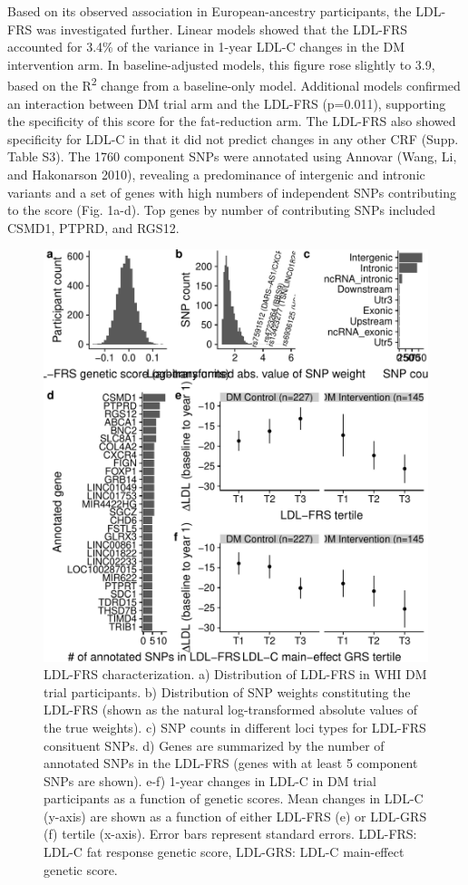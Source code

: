\documentclass[]{article}
\begin{document}
Based on its observed association in European-ancestry participants, the
LDL-FRS was investigated further. Linear models showed that the LDL-FRS
accounted for 3.4\% of the variance in 1-year LDL-C changes in the DM
intervention arm. In baseline-adjusted models, this figure rose slightly
to 3.9, based on the R\textsuperscript{2} change from a baseline-only
model. Additional models confirmed an interaction between DM trial arm
and the LDL-FRS (p=0.011), supporting the specificity of this score for
the fat-reduction arm. The LDL-FRS also showed specificity for LDL-C in
that it did not predict changes in any other CRF (Supp. Table S3). The
1760 component SNPs were annotated using Annovar (Wang, Li, and
Hakonarson 2010), revealing a predominance of intergenic and intronic
variants and a set of genes with high numbers of independent SNPs
contributing to the score (Fig. 1a-d). Top genes by number of
contributing SNPs included CSMD1, PTPRD, and RGS12.

\begin{figure}
\centering
\includegraphics{figures/ldl-score-characterization-1.pdf}
\caption{LDL-FRS characterization. a) Distribution of LDL-FRS in WHI DM
trial participants. b) Distribution of SNP weights constituting the
LDL-FRS (shown as the natural log-transformed absolute values of the
true weights). c) SNP counts in different loci types for LDL-FRS
consituent SNPs. d) Genes are summarized by the number of annotated SNPs
in the LDL-FRS (genes with at least 5 component SNPs are shown). e-f)
1-year changes in LDL-C in DM trial participants as a function of
genetic scores. Mean changes in LDL-C (y-axis) are shown as a function
of either LDL-FRS (e) or LDL-GRS (f) tertile (x-axis). Error bars
represent standard errors. LDL-FRS: LDL-C fat response genetic score,
LDL-GRS: LDL-C main-effect genetic score.}
\end{figure}
\end{document}
